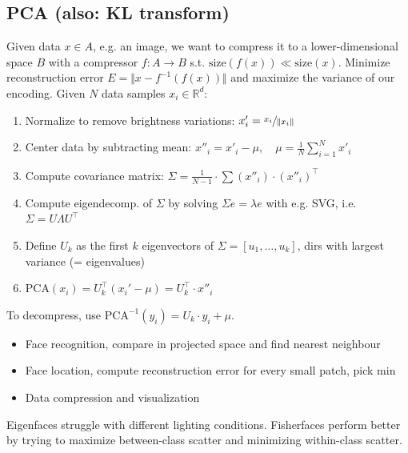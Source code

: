 \documentclass[a4paper,10pt]{article}
\begin{document}
\subsection{PCA (also: KL transform)}
Given data \( x \in A \), e.g. an image, we want to compress it to a lower-dimensional space \( B \) with a compressor \( f: A \to B \) s.t. \( \text{size}(f(x)) \ll \text{size}(x) \). Minimize reconstruction error \( E = \Vert x - f^{-1}(f(x)) \Vert \) and maximize the variance of our encoding. Given \( N \) data samples \( x_i \in \mathbb{R}^d \):
\begin{enumerate}
    \item Normalize to remove brightness variations: \( x'_i = \sfrac{x_i}{\Vert x_i\Vert} \)
    \item Center data by subtracting mean: \( x''_i = x'_i - \mu, \quad \mu = \frac{1}{N}\sum_{i=1}^N x'_i  \)
    \item Compute covariance matrix: \( \Sigma = \frac{1}{N-1}\cdot \sum (x''_i)\cdot (x''_i)^\top \)
    \item Compute eigendecomp. of \( \Sigma \) by solving \( \Sigma e = \lambda e \) with e.g. SVG, i.e. \( \Sigma = U \Lambda U^\top \)
    \item Define \( U_k \) as the first \( k \) eigenvectors of \( \Sigma = \left[u_{1}, \ldots, u_k\right] \), dirs with largest variance (= eigenvalues)
    \item \( \text{PCA}(x_i) = U^\top_k (x_i' - \mu) = U^\top_k \cdot x''_i \)
\end{enumerate}
To decompress, use \( \text{PCA}^{-1}(y_i) = U_k\cdot y_i + \mu  \).
\begin{itemize}
    \item Face recognition, compare in projected space and find nearest neighbour
    \item Face location, compute reconstruction error for every small patch, pick min
    \item Data compression and visualization
\end{itemize}
Eigenfaces struggle with different lighting conditions. Fisherfaces perform better by trying to maximize between-class scatter and minimizing within-class scatter.
\end{document}

